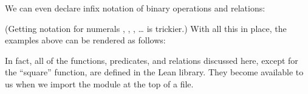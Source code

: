 \documentclass[letterpaper,10pt,english]{sphinxmanual}
\begin{document}
\sphinxAtStartPar
We can even declare infix notation of binary operations and relations:

\begin{sphinxVerbatim}[commandchars=\\\{\}]
      
      
      
\end{sphinxVerbatim}

\sphinxAtStartPar
(Getting notation for numerals , , , … is trickier.) With all this in place, the examples above can be rendered as follows:

\begin{sphinxVerbatim}[commandchars=\\\{\}]
               
               
               
\end{sphinxVerbatim}

\sphinxAtStartPar
In fact, all of the functions, predicates, and relations discussed here,
except for the “square” function, are defined in the Lean library.
They become available to us when we import the module
 at the top of a file.
\end{document}
